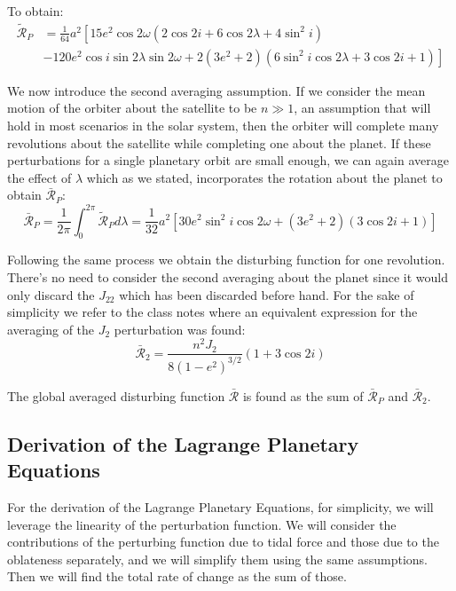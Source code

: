 To obtain:
\begin{equation}
\begin{aligned}
\tilde{\mathcal{R}}_P &= \frac{1}{64} a^2 \left[15 e^2 \cos 2 \omega  \left(2 \cos 2i + 6 \cos 2 \lambda +4 \sin^2 i \right) \right.\\
&\left. -120 e^2 \cos i \sin 2 \lambda \sin 2 \omega + 2 \left(3 e^2+2\right) \left(6 \sin^2 i \cos 2 \lambda +3 \cos 2i +1\right) \right]
\end{aligned}
\end{equation}

We now introduce the second averaging assumption. If we consider the mean motion of the orbiter about the satellite to be $n \gg 1$, an assumption that will hold in most scenarios in the solar system, then the orbiter will complete many revolutions about the satellite while completing one about the planet. If these perturbations for a single planetary orbit are small enough, we can again average the effect of $\lambda$ which as we stated, incorporates the rotation about the planet to obtain $\bar{\mathcal{R}}_P$:
\begin{equation}
\bar{\mathcal{R}}_P = \frac{1}{2\pi} \int_0^{2\pi} \tilde{\mathcal{R}}_P d\lambda = \frac{1}{32} a^2 \left[30 e^2 \sin^2 i \cos 2 \omega +\left(3 e^2+2\right) (3 \cos 2i +1)\right]
\end{equation}

Following the same process we obtain the disturbing function for one revolution. There's no need to consider the second averaging about the planet since it would only discard the $J_{22}$ which has been discarded before hand. For the sake of simplicity we refer to the class notes where an equivalent expression for  the averaging of the $J_2$ perturbation was found:
\begin{equation}
\bar{\mathcal{R}}_2 = \frac{n^2 J_2}{8 (1-e^2)^{3/2}} \left(1 + 3 \cos 2i\right)
\end{equation}

The global averaged disturbing function $\bar{\mathcal{R}}$ is found as the sum of $\bar{\mathcal{R}}_P$ and $\bar{\mathcal{R}}_2$.

\subsection{Derivation of the Lagrange Planetary Equations}
For the derivation of the Lagrange Planetary Equations, for simplicity, we will leverage the linearity of the perturbation function. We will consider the contributions of the perturbing function due to tidal force and those due to the oblateness separately, and we will simplify them using the same assumptions. Then we will find the total rate of change as the sum of those.

